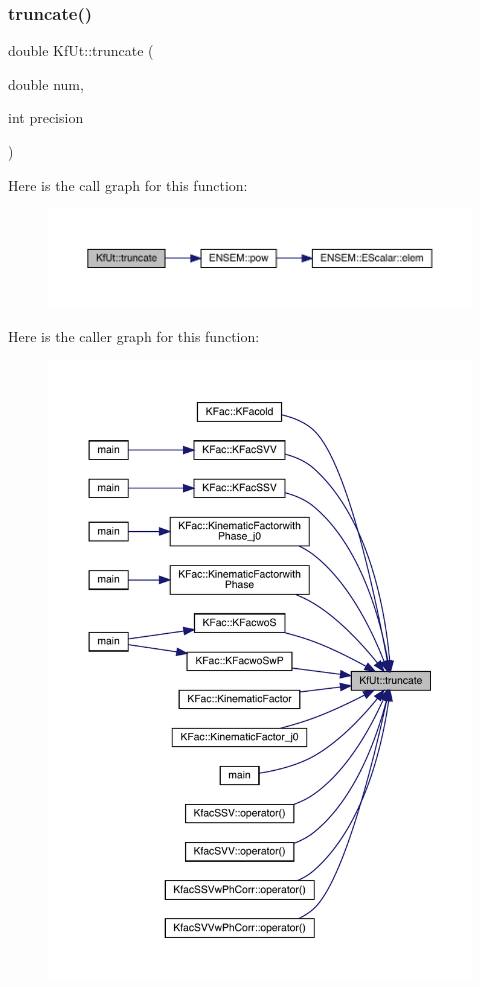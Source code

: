 \subsubsection{\texorpdfstring{truncate()}{truncate()}}
{\footnotesize\ttfamily double Kf\+Ut\+::truncate (\begin{DoxyParamCaption}\item[{double}]{num,  }\item[{int}]{precision }\end{DoxyParamCaption})}

Here is the call graph for this function\+:
\nopagebreak
\begin{figure}[H]
\begin{center}
\leavevmode
\includegraphics[width=350pt]{d8/da5/namespaceKfUt_a155e8db38d770e216ef19d9938394c17_cgraph}
\end{center}
\end{figure}
Here is the caller graph for this function\+:
\nopagebreak
\begin{figure}[H]
\begin{center}
\leavevmode
\includegraphics[width=350pt]{d8/da5/namespaceKfUt_a155e8db38d770e216ef19d9938394c17_icgraph}
\end{center}
\end{figure}
